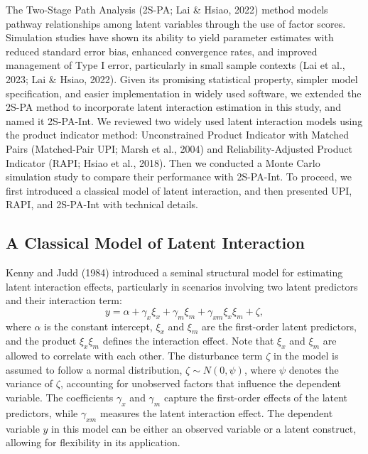 \documentclass[
  man]{apa6}
\begin{document}
The Two-Stage Path Analysis (2S-PA; Lai \& Hsiao, 2022) method models pathway relationships among latent variables through the use of factor scores. Simulation studies have shown its ability to yield parameter estimates with reduced standard error bias, enhanced convergence rates, and improved management of Type I error, particularly in small sample contexts (Lai et al., 2023; Lai \& Hsiao, 2022). Given its promising statistical property, simpler model specification, and easier implementation in widely used software, we extended the 2S-PA method to incorporate latent interaction estimation in this study, and named it 2S-PA-Int. We reviewed two widely used latent interaction models using the product indicator method: Unconstrained Product Indicator with Matched Pairs (Matched-Pair UPI; Marsh et al., 2004) and Reliability-Adjusted Product Indicator (RAPI; Hsiao et al., 2018). Then we conducted a Monte Carlo simulation study to compare their performance with 2S-PA-Int. To proceed, we first introduced a classical model of latent interaction, and then presented UPI, RAPI, and 2S-PA-Int with technical details.

\subsection{A Classical Model of Latent Interaction}\label{a-classical-model-of-latent-interaction}

Kenny and Judd (1984) introduced a seminal structural model for estimating latent interaction effects, particularly in scenarios involving two latent predictors and their interaction term:
\begin{equation}
y = \alpha + \gamma_{x}\xi_{x} + \gamma_{m}\xi_{m} + \gamma_{xm}\xi_{x}\xi_{m} + \zeta,
\end{equation}
where \(\alpha\) is the constant intercept, \(\xi_{x}\) and \(\xi_{m}\) are the first-order latent predictors, and the product \(\xi_{x}\xi_{m}\) defines the interaction effect. Note that \(\xi_{x}\) and \(\xi_{m}\) are allowed to correlate with each other. The disturbance term \(\zeta\) in the model is assumed to follow a normal distribution, \(\zeta \sim N(0, \psi)\), where \(\psi\) denotes the variance of \(\zeta\), accounting for unobserved factors that influence the dependent variable. The coefficients \(\gamma_{x}\) and \(\gamma_{m}\) capture the first-order effects of the latent predictors, while \(\gamma_{xm}\) measures the latent interaction effect. The dependent variable \(y\) in this model can be either an observed variable or a latent construct, allowing for flexibility in its application.
\end{document}
